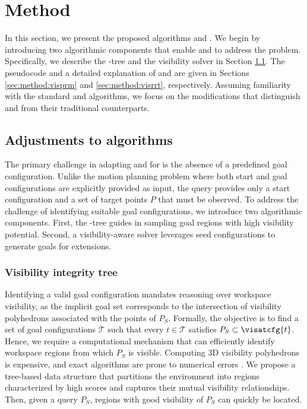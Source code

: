\section{Method}
\label{sec:method}

In this section, we present the proposed \vistamp algorithms \visprm and \visrrt. We begin by introducing two algorithmic components that enable \prm and \rrt to address the \tvmp problem. Specifically, we describe the \vi-tree and the visibility \ik solver in Section \ref{sec:method:adjusments}. The pseudocode and a detailed explanation of \visprm and \visrrt are given in Sections \ref{sec:method:visprm} and \ref{sec:method:visrrt}, respectively. Assuming familiarity with the standard \prm and \rrt algorithms, we focus on the modifications that distinguish \visprm and \visrrt from their traditional counterparts.


\subsection{Adjustments to \sbmp algorithms}
\label{sec:method:adjusments}

The primary challenge in adapting \prm and \rrt for \tvmp is the absence of a predefined goal configuration. Unlike the motion planning problem where both start and goal configurations are explicitly provided as input, the \tvmp query provides only a start configuration and a set of target points $P$ that must be observed. To address the challenge of identifying suitable goal configurations, we introduce two algorithmic components. First, the \vi-tree guides \visprm in sampling goal regions with high visibility potential. Second, a visibility-aware \ik solver leverages seed configurations to generate goals for \visrrt extensions. 


\subsubsection{Visibility integrity tree}
\label{sec:method:visibility:integrity:tree}

Identifying a valid goal configuration mandates reasoning over workspace visibility, as the implicit goal set corresponds to the intersection of visibility polyhedrons associated with the points of $P_S$. Formally, the objective is to find a set of goal configurations $\mathcal{T}$ such that every $t\in \mathcal{T}$ satisfies $P_S \subset \visatcfg{t}$. Hence, we require a computational mechanism that can efficiently identify workspace regions from which $P_S$ is visible. Computing 3D visibility polyhedrons is expensive, and exact algorithms are prone to numerical errors \cite{d-3dvasa-99}. We propose a tree-based data structure that partitions the environment into regions characterized by high \vi scores and captures their mutual visibility relationships. Then, given a query $P_S$, regions with good visibility of $P_S$ can quickly be located.  


